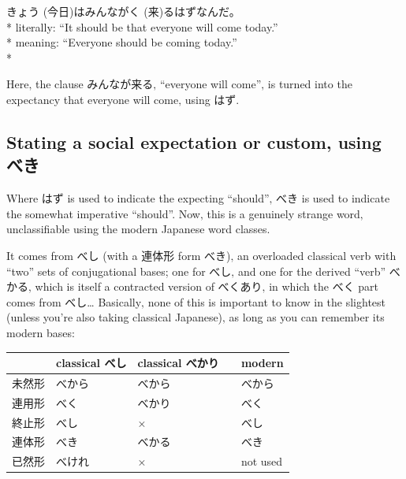 \documentclass[11pt, b5paper, twoside, openright, onecolumn]{book}
\makeatletter
\newcommand*{\rubystack}[2]{{\relscale{0.5}%
  \begin{tabular}[b]{@{}c@{}}%
    {#1}\\%
   {\textscale{2}{#2}}%
  \end{tabular}}%
}
\DeclareRobustCommand*{\ruby}[2]{%
  \mbox{%
    \setlength{\parskip}{0ex}%
    \BeginAccSupp{method=pdfstringdef,ActualText={#1}}%
      \rubystack{\phantom{#2}}{#1}%
      \llap{%
        \rubystack{#2}{\phantom{#1}}%
      }%
    \EndAccSupp{}%
  }%
}
\renewcommand*{\ruby}[2]{#2 (#1)}%
\newenvironment{exampleblock}{
\setlength{\parindent}{0.6in}
\begin{minipage}[t]{\dimexpr\textwidth-\parindent}}
{\end{minipage}}
\newenvironment{mytabular}[1]{\noindent\hspace{0.4in}
\begin{tabular}[h]{#1}}{\end{tabular}}
\makeatother
\begin{document}
\vspace{0.4cm}
\begin{exampleblock}
\ruby{今日}{きょう}はみんなが\ruby{来}{く}るはずなんだ。 \\* 
literally: “It should be that everyone will come today.” \\* 
meaning: “Everyone should be coming today.” \\* 
\end{exampleblock}
\vspace{0.2cm}

Here‚ the clause みんなが来る‚ “everyone will come”‚ is turned into the expectancy that everyone will come‚ using はず.

\subsection{Stating a social expectation or custom‚ using べき}

Where はず is used to indicate the expecting “should”‚ べき is used to indicate the somewhat imperative “should”. Now‚ this is a genuinely strange word‚ unclassifiable using the modern Japanese word classes.

It comes from べし (with a 連体形 form べき)‚ an overloaded classical verb with “two” sets of conjugational bases; one for べし‚ and one for the derived “verb” べかる‚ which is itself a contracted version of べくあり‚ in which the べく part comes from べし… Basically‚ none of this is important to know in the slightest (unless you’re also taking classical Japanese)‚ as long as you can remember its modern bases:

\vspace{0.5cm}
\smaller
\begin{mytabular}{| l  l  l  l  l |}\hline 
\rule{0pt}{2.4ex} & classical べし & classical べかり &  & modern\\ 
\hline
\rule{0pt}{2.4ex}未然形 & べから & べから &  & べから\\ 
\rule{0pt}{2.4ex}連用形 & べく & べかり &  & べく\\ 
\rule{0pt}{2.4ex}終止形 & べし & × &  & べし\\ 
\rule{0pt}{2.4ex}連体形 & べき & べかる &  & べき\\ 
\rule{0pt}{2.4ex}已然形 & べけれ & × &  & not used\\ 
\hline 
\end{mytabular}
\larger
\vspace{0.5cm}
\end{document}
